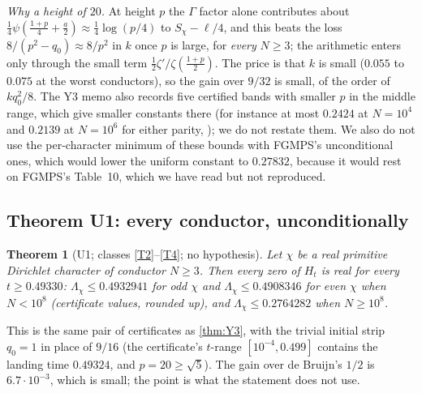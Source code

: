 \documentclass[11pt]{article}
\newtheorem{theorem}{Theorem}[section]
\theoremstyle{definition}
\newcommand{\Lc}{\Lambda}
\begin{document}
\emph{Why a height of $20$.} At height $p$ the $\Gamma$ factor alone contributes about $\tfrac14\psi(\tfrac{1+p}{4} + \tfrac a2) \approx \tfrac14\log(p/4)$ to $S_\chi - \ell/4$, and this beats the loss $8/(p^2 - q_0) \approx 8/p^2$ in $k$ once $p$ is large, for \emph{every} $N \ge 3$; the arithmetic enters only through the small term $\tfrac12\zeta'/\zeta(\tfrac{1+p}{2})$. The price is that $k$ is small ($0.055$ to $0.075$ at the worst conductors), so the gain over $9/32$ is small, of the order of $kq_0^2/8$. The Y3 memo also records five certified bands with smaller $p$ in the middle range, which give smaller constants there (for instance at most $0.2424$ at $N = 10^4$ and $0.2139$ at $N = 10^6$ for either parity, \cite[Y3 memo \S3.4]{dq1records}); we do not restate them. We also do not use the per-character minimum of these bounds with FGMPS's unconditional ones, which would lower the uniform constant to $0.27832$, because it would rest on FGMPS's Table~10, which we have read but not reproduced.

\subsection{Theorem U1: every conductor, unconditionally}\label{sec:U1}

\begin{theorem}[U1; classes \ref{T2}--\ref{T4}; no hypothesis]\label{thm:U1}
Let $\chi$ be a real primitive Dirichlet character of conductor $N \ge 3$. Then every zero of $H_t$ is real for every $t \ge 0.49330$: $\Lc_\chi \le 0.4932941$ for odd $\chi$ and $\Lc_\chi \le 0.4908346$ for even $\chi$ when $N < 10^8$ (certificate values, rounded up), and $\Lc_\chi \le 0.2764282$ when $N \ge 10^8$.
\end{theorem}

\noindent
This is the same pair of certificates as \cref{thm:Y3}, with the trivial initial strip $q_0 = 1$ in place of $9/16$ (the certificate's $t$-range $[10^{-4}, 0.499]$ contains the landing time $0.49324$, and $p = 20 \ge \sqrt5$). The gain over de Bruijn's $1/2$ is $6.7\cdot10^{-3}$, which is small; the point is what the statement does not use.
\end{document}
